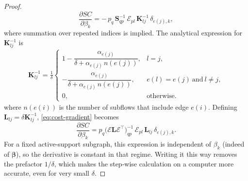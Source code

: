 \documentclass[twocolumn,english,groupedaddress, superscriptaddress,aps,pre,10pt,floatfix]{revtex4-2}
\newcommand{\matr}[1]{{\boldsymbol{#1}}}
\begin{document}
\begin{proof}
\begin{equation}
    \frac{\partial SC}{\partial \beta_{k}}
        = -\,p_{q}\,\matr{S}^{-1}_{qp}\,\matr{\mathcal{E}}_{pl}\,\matr{K}^{-1}_{lj}\,\delta_{e(j),k},
\end{equation}
where summation over repeated indices is implied.
The analytical expression for $\matr{K}^{-1}_{lj}$ is
\begin{align}
\matr{K}^{-1}_{lj}= \frac{1}{\delta}
\begin{cases}
1-\dfrac{\alpha_{e(j)}}{\delta+\alpha_{e(j)}\,n(e(j))}, & l=j,\\[6pt]
-\dfrac{\alpha_{e(j)}}{\delta+\alpha_{e(j)}\,n(e(j))}, & e(l)=e(j)\ \text{and}\ l\neq j,\\[6pt]
0, & \text{otherwise.}
\end{cases}
\end{align}
where $n(e(i))$ is the number of subflows that include edge $e(i)$. Defining $\matr{L}_{lj}= \delta \matr{K}^{-1}_{lj}$, \cref{eq:cost-gradient} becomes
\begin{equation}
    \frac{\partial SC}{\partial \beta_{k}}
        = p_{q}\bigl(\matr{\mathcal{E}}\matr{L}\matr{\mathcal{E}}^{\!\top}\bigr)^{-1}_{qp}\,
          \matr{\mathcal{E}}_{pl}\,\matr{L}_{lj}\,\delta_{e(j),k}.
\end{equation}
For a fixed active-support subgraph, this expression is independent of $\beta_k$ (indeed of $\boldsymbol{\beta}$), so the derivative is constant in that regime.
Writing it this way removes the prefactor $1/\delta$, which makes the step‑wise calculation on a computer more accurate, even for very small $\delta$.
\end{proof}



\end{document}
